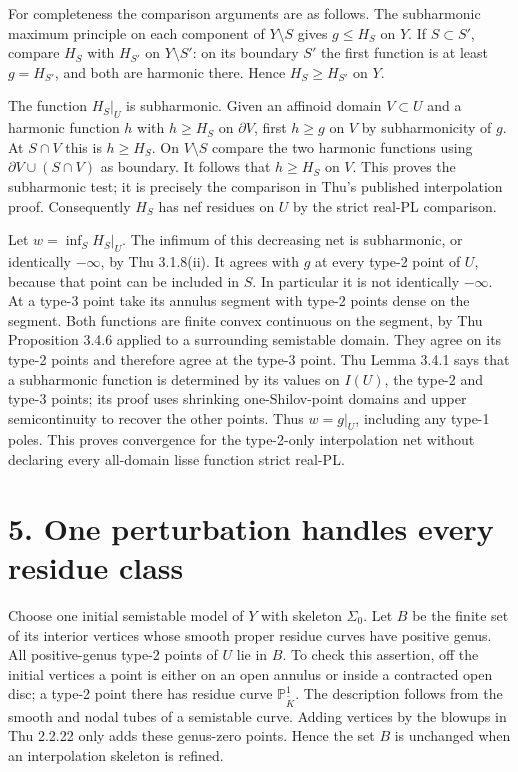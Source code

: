 \documentclass[11pt]{article}
\begin{document}
For completeness the comparison arguments are as follows. The subharmonic maximum principle on each component of $Y\setminus S$ gives $g\leq H_S$ on $Y$. If $S\subset S'$, compare $H_S$ with $H_{S'}$ on $Y\setminus S'$: on its boundary $S'$ the first function is at least $g=H_{S'}$, and both are harmonic there. Hence $H_S\geq H_{S'}$ on $Y$.

The function $H_S|_U$ is subharmonic. Given an affinoid domain $V\subset U$ and a harmonic function $h$ with $h\geq H_S$ on $\partial V$, first $h\geq g$ on $V$ by subharmonicity of $g$. At $S\cap V$ this is $h\geq H_S$. On $V\setminus S$ compare the two harmonic functions using $\partial V\cup(S\cap V)$ as boundary. It follows that $h\geq H_S$ on $V$. This proves the subharmonic test; it is precisely the comparison in Thu's published interpolation proof. Consequently $H_S$ has nef residues on $U$ by the strict real-PL comparison.

Let $w=\inf_S H_S|_U$. The infimum of this decreasing net is subharmonic, or identically $-\infty$, by Thu 3.1.8(ii). It agrees with $g$ at every type-2 point of $U$, because that point can be included in $S$. In particular it is not identically $-\infty$. At a type-3 point take its annulus segment with type-2 points dense on the segment. Both functions are finite convex continuous on the segment, by Thu Proposition 3.4.6 applied to a surrounding semistable domain. They agree on its type-2 points and therefore agree at the type-3 point. Thu Lemma 3.4.1 says that a subharmonic function is determined by its values on $I(U)$, the type-2 and type-3 points; its proof uses shrinking one-Shilov-point domains and upper semicontinuity to recover the other points. Thus $w=g|_U$, including any type-1 poles. This proves convergence for the type-2-only interpolation net without declaring every all-domain lisse function strict real-PL.

\section*{5. One perturbation handles every residue class}

Choose one initial semistable model of $Y$ with skeleton $\Sigma_0$. Let $B$ be the finite set of its interior vertices whose smooth proper residue curves have positive genus. All positive-genus type-2 points of $U$ lie in $B$. To check this assertion, off the initial vertices a point is either on an open annulus or inside a contracted open disc; a type-2 point there has residue curve $\mathbb P^1_{\widetilde K}$. The description follows from the smooth and nodal tubes of a semistable curve. Adding vertices by the blowups in Thu 2.2.22 only adds these genus-zero points. Hence the set $B$ is unchanged when an interpolation skeleton is refined.
\end{document}
